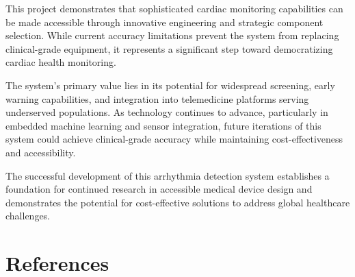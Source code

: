 \documentclass[12pt,a4paper]{article}
\begin{document}
This project demonstrates that sophisticated cardiac monitoring capabilities can be made accessible through innovative engineering and strategic component selection. While current accuracy limitations prevent the system from replacing clinical-grade equipment, it represents a significant step toward democratizing cardiac health monitoring.

The system's primary value lies in its potential for widespread screening, early warning capabilities, and integration into telemedicine platforms serving underserved populations. As technology continues to advance, particularly in embedded machine learning and sensor integration, future iterations of this system could achieve clinical-grade accuracy while maintaining cost-effectiveness and accessibility.

The successful development of this arrhythmia detection system establishes a foundation for continued research in accessible medical device design and demonstrates the potential for cost-effective solutions to address global healthcare challenges.

\section*{References}
\end{document}
